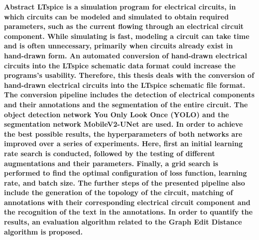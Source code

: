\newpage
\bfseries
{Abstract}
\normalfont
LTspice is a simulation program for electrical circuits, in which circuits can be modeled and simulated to obtain required parameters, such as the current flowing through an electrical circuit component.
While simulating is fast, modeling a circuit can take time and is often unnecessary, primarily when circuits already exist in hand-drawn form.
An automated conversion of hand-drawn electrical circuits into the LTspice schematic data format could increase the programs's usability.
Therefore, this thesis deals with the conversion of hand-drawn electrical circuits into the LTspice schematic file format.
The conversion pipeline includes the detection of electrical components and their annotations and the segmentation of the entire circuit.
The object detection network You Only Look Once (YOLO) and the segmentation network MobileV2-UNet are used.
In order to achieve the best possible results, the hyperparameters of both networks are improved over a series of experiments.
Here, first an initial learning rate search is conducted, followed by the testing of different augmentations and their parameters.
Finally, a grid search is performed to find the optimal configuration of loss function, learning rate, and batch size.
The further steps of the presented pipeline also include the generation of the topology of the circuit, matching of annotations with their corresponding electrical circuit component and the recognition of the text in the annotations.
In order to quantify the results, an evaluation algorithm related to the Graph Edit Distance algorithm \cite{graph_edit_distance} is proposed.

